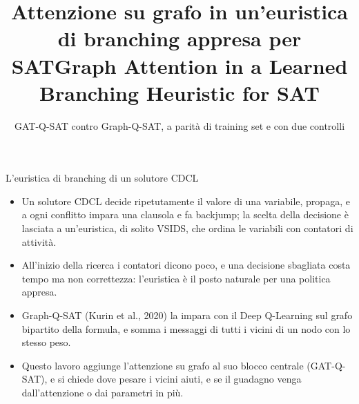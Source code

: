 \documentclass[aspectratio=169]{beamer}
\title{Attenzione su grafo in un'euristica\\ di branching appresa per SAT}
\title{Graph Attention in a Learned\\ Branching Heuristic for SAT}
\subtitle{\T{GAT-Q-SAT against Graph-Q-SAT, at matched training set and with two controls}%
            {GAT-Q-SAT contro Graph-Q-SAT, a parit\`a di training set e con due controlli}}
\author{\textcolor{lamalunga-primary}{\halo{Antonio Frangioni \quad Donato Meoli}}}
\institute{\textcolor{lamalunga-accent}{\halo{Universit\`a di Pisa}}}
\date{}
\newcommand{\T}[2]{#2}
\newcommand{\T}[2]{#1}
\begin{document}
\maketitle
{}

\begin{frame}{\T{The branching heuristic of a CDCL solver}{L'euristica di branching di un solutore CDCL}}
  \begin{itemize}
    \item \T{A CDCL solver repeatedly decides the value of a variable, propagates, and on a
          conflict learns a clause and backjumps; the choice of the decision is left to a
          heuristic, usually VSIDS, which ranks the variables by activity counters.}%
          {Un solutore CDCL decide ripetutamente il valore di una variabile, propaga, e a ogni
          conflitto impara una clausola e fa backjump; la scelta della decisione \`e lasciata a
          un'euristica, di solito VSIDS, che ordina le variabili con contatori di attivit\`a.}
    \item \T{The counters carry little information at the start of the search, and a poor
          decision costs time but never correctness: the heuristic is a natural place for a
          learned policy.}%
          {All'inizio della ricerca i contatori dicono poco, e una decisione sbagliata costa
          tempo ma non correttezza: l'euristica \`e il posto naturale per una politica appresa.}
    \item \T{Graph-Q-SAT (Kurin et al., 2020) learns it by Deep Q-Learning on the bipartite
          graph of the formula, and sums the messages of all the neighbors of a node with the
          same weight.}%
          {Graph-Q-SAT (Kurin et al., 2020) la impara con il Deep Q-Learning sul grafo
          bipartito della formula, e somma i messaggi di tutti i vicini di un nodo con lo
          stesso peso.}
    \item \T{This work adds graph attention to its core block (GAT-Q-SAT), and asks where
          weighting the neighbors helps, and whether the gain comes from the attention or
          from the added parameters.}%
          {Questo lavoro aggiunge l'attenzione su grafo al suo blocco centrale (GAT-Q-SAT), e
          si chiede dove pesare i vicini aiuti, e se il guadagno venga dall'attenzione o dai
          parametri in pi\`u.}
  \end{itemize}
\end{frame}
\end{document}
